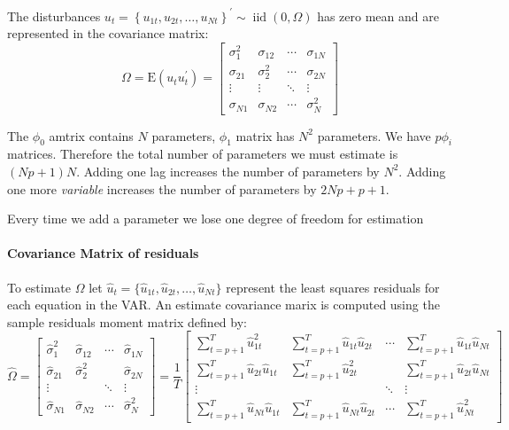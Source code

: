 \documentclass[11pt]{article}
\begin{document}
The disturbances $u_t=\left\{u_{1 t}, u_{2 t}, \ldots, u_{N t}\right\}^{\prime} \sim \operatorname{iid}(0, \Omega)$ has zero mean and are represented in the covariance matrix:
\begin{equation}
    \Omega=\mathrm{E}\left(u_t u_t^{\prime}\right)=\left[\begin{array}{llll}\sigma_1^2 & \sigma_{12} & \cdots & \sigma_{1 N} \\ \sigma_{21} & \sigma_2^2 & \cdots & \sigma_{2 N} \\ \vdots & \vdots & \ddots & \vdots \\ \sigma_{N 1} & \sigma_{N 2} & \cdots & \sigma_N^2\end{array}\right]
\end{equation}

\begin{note}
    The $\phi_0$ amtrix contains $N$ parameters, $\phi_1$ matrix has $N^2$ parameters. We have $p \phi_i$ matrices. Therefore the total number of parameters we must estimate is $(Np+1)N$. Adding one lag increases the number of parameters by $N^2$. Adding one more \textit{variable} increases the number of parameters by $2Np + p + 1$. 

    Every time we add a parameter we lose one degree of freedom for estimation
\end{note}

\paragraph{Covariance Matrix of residuals} \mbox{}

To estimate $\Omega$ let $\hat{u}_t = \{\hat{u}_{1t}, \hat{u}_{2t}, \ldots, \hat{u}_{Nt}\}$ represent the least squares residuals for each equation in the VAR. An estimate covariance marix is computed using the sample residuals moment matrix defined by:
\begin{equation}
    \widehat{\Omega}=\left[\begin{array}{cccc}\widehat{\sigma}_1^2 & \widehat{\sigma}_{12} & \cdots & \widehat{\sigma}_{1 N} \\ \widehat{\sigma}_{21} & \widehat{\sigma}_2^2 & & \widehat{\sigma}_{2 N} \\ \vdots & & \ddots & \vdots \\ \widehat{\sigma}_{N 1} & \widehat{\sigma}_{N 2} & \cdots & \widehat{\sigma}_N^2\end{array}\right] =\frac{1}{T}\left[\begin{array}{cccc}\sum_{t=p+1}^T \widehat{u}_{1 t}^2 & \sum_{t=p+1}^T \widehat{u}_{1 t} \widehat{u}_{2 t} & \cdots & \sum_{t=p+1}^T \widehat{u}_{1 t} \widehat{u}_{N t} \\ \sum_{t=p+1}^T \widehat{u}_{2 t} \widehat{u}_{1 t} & \sum_{t=p+1}^T \widehat{u}_{2 t}^2 & & \sum_{t=p+1}^T \widehat{u}_{2 t} \widehat{u}_{N t} \\ \vdots & & \ddots & \vdots \\ \sum_{t=p+1}^T \widehat{u}_{N t} \widehat{u}_{1 t} & \sum_{t=p+1}^T \widehat{u}_{N t} \widehat{u}_{2 t} & \cdots & \sum_{t=p+1}^T \widehat{u}_{N t}^2\end{array}\right]
\end{equation}
\end{document}
